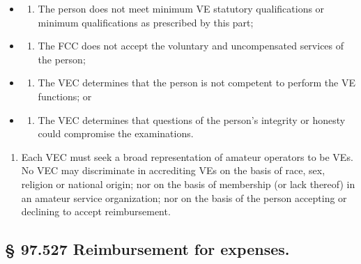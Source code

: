 \documentclass[
  letterpaper,
  DIV=11,
  numbers=noendperiod]{scrreport}
\providecommand{\tightlist}{%
  \setlength{\itemsep}{0pt}\setlength{\parskip}{0pt}}\usepackage{longtable,booktabs,array}
\begin{document}
\begin{itemize}
\item
  \begin{enumerate}
  \def\labelenumi{(\arabic{enumi})}
  \tightlist
  \item
    The person does not meet minimum VE statutory qualifications or
    minimum qualifications as prescribed by this part;
  \end{enumerate}
\item
  \begin{enumerate}
  \def\labelenumi{(\arabic{enumi})}
  \setcounter{enumi}{1}
  \tightlist
  \item
    The FCC does not accept the voluntary and uncompensated services of
    the person;
  \end{enumerate}
\item
  \begin{enumerate}
  \def\labelenumi{(\arabic{enumi})}
  \setcounter{enumi}{2}
  \tightlist
  \item
    The VEC determines that the person is not competent to perform the
    VE functions; or
  \end{enumerate}
\item
  \begin{enumerate}
  \def\labelenumi{(\arabic{enumi})}
  \setcounter{enumi}{3}
  \tightlist
  \item
    The VEC determines that questions of the person's integrity or
    honesty could compromise the examinations.
  \end{enumerate}
\end{itemize}

\begin{enumerate}
\def\labelenumi{(\alph{enumi})}
\setcounter{enumi}{1}
\tightlist
\item
  Each VEC must seek a broad representation of amateur operators to be
  VEs. No VEC may discriminate in accrediting VEs on the basis of race,
  sex, religion or national origin; nor on the basis of membership (or
  lack thereof) in an amateur service organization; nor on the basis of
  the person accepting or declining to accept reimbursement.
\end{enumerate}

\hypertarget{reimbursement-for-expenses.}{%
\subsection*{§ 97.527 Reimbursement for
expenses.}\label{reimbursement-for-expenses.}}
\end{document}
